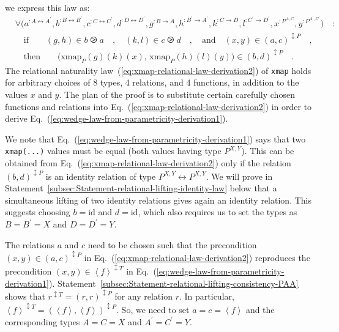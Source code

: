 we express this law as:
\begin{align}
 & \forall\big(a^{:A\leftrightarrow A^{\prime}},b^{:B\leftrightarrow B^{\prime}},c^{:C\leftrightarrow C^{\prime}},d^{:D\leftrightarrow D^{\prime}},g^{:B\rightarrow A},h^{:B^{\prime}\rightarrow A^{\prime}},k^{:C\rightarrow D},l^{:C^{\prime}\rightarrow D^{\prime}},x^{:P^{A,C}},y^{:P^{A^{\prime},C^{\prime}}}\big)\quad:\nonumber \\
 & \quad\text{if}\quad\quad(g,h)\in b\ogreaterthan a\quad,\quad(k,l)\in c\ogreaterthan d\quad,\quad\text{and}\quad(x,y)\in(a,c)^{\updownarrow P}\quad,\nonumber \\
 & \quad\text{then}\quad\quad\big(\text{xmap}_{P}(g)(k)(x),\,\text{xmap}_{P}(h)(l)(y)\big)\in(b,d)^{\updownarrow P}\quad.\label{eq:xmap-relational-law-derivation2}
\end{align}
The relational naturality law~(\ref{eq:xmap-relational-law-derivation2})
of \lstinline!xmap! holds for arbitrary choices of 8 types, 4 relations,
and 4 functions, in addition to the values $x$ and $y$. The plan
of the proof is to substitute certain carefully chosen functions and
relations into Eq.~(\ref{eq:xmap-relational-law-derivation2}) in
order to derive Eq.~(\ref{eq:wedge-law-from-parametricity-derivation1}). 

We note that Eq.~(\ref{eq:wedge-law-from-parametricity-derivation1})
says that two \lstinline!xmap(...)! values must be equal (both values
having type $P^{X,Y}$). This can be obtained from Eq.~(\ref{eq:xmap-relational-law-derivation2})
only if the relation $(b,d)^{\updownarrow P}$ is an identity relation
of type $P^{X,Y}\leftrightarrow P^{X,Y}$. We will prove in Statement~\ref{subsec:Statement-relational-lifting-identity-law}
below that a simultaneous lifting of two identity relations gives
again an identity relation. This suggests choosing $b=\text{id}$
and $d=\text{id}$, which also requires us to set the types as $B=B^{\prime}=X$
and $D=D^{\prime}=Y$.

The relations $a$ and $c$ need to be chosen such that the precondition
$(x,y)\in(a,c)^{\updownarrow P}$ in Eq.~(\ref{eq:xmap-relational-law-derivation2})
reproduces the precondition $(x,y)\in\left<f\right>^{\updownarrow T}$
in Eq.~(\ref{eq:wedge-law-from-parametricity-derivation1}). Statement~\ref{subsec:Statement-relational-lifting-consistency-PAA}
shows that $r^{\updownarrow T}=(r,r)^{\updownarrow P}$ for any relation
$r$. In particular, $\left<f\right>^{\updownarrow T}=(\left<f\right>,\left<f\right>)^{\updownarrow P}$.
So, we need to set $a=c=\left<f\right>$ and the corresponding types
$A=C=X$ and $A^{\prime}=C^{\prime}=Y$.

